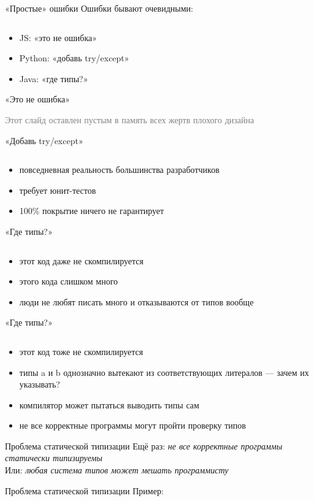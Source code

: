 \documentclass[10pt]{beamer}
\newcommand{\light}[1]{\textcolor{gray}{\footnotesize{#1}}}
\newcommand{\code}[4]{\inputminted[linenos, frame=none, firstline=#2, lastline=#3,
  framesep=10pt, bgcolor=lightgray]{#4}{#1}}
\begin{document}
\begin{frame}[fragile]{«Простые» ошибки}
  Ошибки бывают очевидными:
  \code{code.py}{1}{3}{python}
  \begin{itemize}
  \item JS: «это не ошибка»
  \item Python: «добавь try/except»
  \item Java: «где типы?»
  \end{itemize}
\end{frame}

\begin{frame}{«Это не ошибка»}
  \begin{center}
    \light{Этот слайд оставлен пустым в память всех жертв плохого дизайна}
  \end{center}
\end{frame}

\begin{frame}{«Добавь try/except»}
  \code{code.py}{5}{10}{python}
  \begin{itemize}
  \item повседневная реальность большинства разработчиков
  \item требует юнит-тестов
  \item 100\% покрытие ничего не гарантирует
  \end{itemize}
\end{frame}

\begin{frame}{«Где типы?»}
  \code{code.java}{1}{7}{java}
  \begin{itemize}
  \item этот код даже не скомпилируется
  \item этого кода слишком много
  \item люди не любят писать много и отказываются от типов вообще
  \end{itemize}
\end{frame}

\begin{frame}{«Где типы?»}
  \code{code.hs}{1}{3}{haskell}
  \begin{itemize}
  \item этот код тоже не скомпилируется
  \item типы a и b однозначно вытекают из соответствующих литералов — зачем их указывать?
  \item компилятор может пытаться выводить типы сам
  \item не все корректные программы могут пройти проверку типов
  \end{itemize}
\end{frame}

\begin{frame}{Проблема статической типизации}
  Ещё раз: \emph{не все корректные программы статически типизируемы}\vspace{2em}\\
  Или: \emph{любая система типов может мешать программисту}
\end{frame}

\begin{frame}{Проблема статической типизации}
  Пример:
  \code{code.java}{17}{23}{java}
\end{frame}
\end{document}

